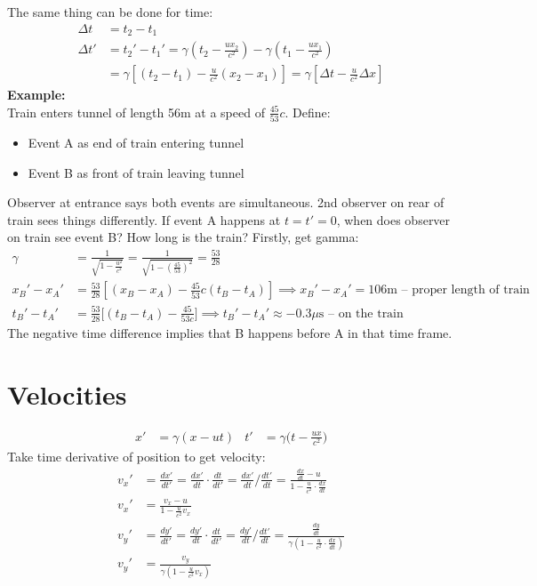 \documentclass[a4paper, 11pt, normalem]{report}
\begin{document}
The same thing can be done for time:
\begin{align}
    \Delta t &= t_{2} - t_{1} \\
    \Delta t' &= t_{2}' -t_{1}' = \gamma(t_{2} - \frac{ux_{2}}{c^{2}}) - \gamma(t_{1} - \frac{ux_{1}}{c^{2}}) \\
              &= \gamma[(t_{2} - t_{1}) - \frac{u}{c^{2}}(x_{2} - x_{1})] = \gamma[\Delta t - \frac{u}{c^{2}}\Delta x]
\end{align}
\textbf{Example:}\\
Train enters tunnel of length 56m at a speed of $\frac{45}{53}c$.
Define:
\begin{itemize}
    \item Event A as end of train entering tunnel
    \item Event B as front of train leaving tunnel
\end{itemize}
Observer at entrance says both events are simultaneous.
2nd observer on rear of train sees things differently.
If event A happens at $t = t' = 0$, when does observer on train see event B? 
How long is the train?
Firstly, get gamma:
\begin{align}
    \gamma &= \frac{1}{\sqrt{1 - \tfrac{u^{2}}{c^{2}}}} = \frac{1}{\sqrt{1 - (\tfrac{45}{53})^{2}}} = \frac{53}{28} \\
    x_{B}' - x_{A}' &= \frac{53}{28}[(x_{B} - x_{A}) - \frac{45}{53}c(t_{B} - t_{A})] \implies x_{B}' -x_{A}' = 106\text{m -- proper length of train} \\
    t_{B}' - t_{A}' &= \frac{53}{28}\Big[(t_{B} - t_{A}) - \frac{45}{53c}\Big] \implies t_{B}' - t_{A}' \approx -0.3\mu\text{s -- on the train}
\end{align}
The negative time difference implies that B happens before A in that time frame.

\section{Velocities}
\begin{align}
    x' &= \gamma(x - ut) & t' &= \gamma\Big(t - \frac{ux}{c^{2}}\Big)
\end{align}
Take time derivative of position to get velocity:
\begin{align}
    v_{x}' &= \frac{dx'}{dt'} = \frac{dx'}{dt}\cdot\frac{dt}{dt'} = \frac{dx'}{dt}\Big/\frac{dt'}{dt} = \frac{\tfrac{dx}{dt} - u}{1 - \tfrac{u}{c^{2}}\cdot\tfrac{dx}{dt}} \\
    v_{x}' &= \frac{v_{x} - u}{1 - \tfrac{u}{c^{2}}v_{x}} \\
    v_{y}' &= \frac{dy'}{dt'} = \frac{dy'}{dt}\cdot\frac{dt}{dt'} = \frac{dy'}{dt}\Big/\frac{dt'}{dt} = \frac{\tfrac{dy}{dt}}{\gamma(1 - \tfrac{u}{c^{2}}\cdot\tfrac{dx}{dt})} \\
    v_{y}' &= \frac{v_{y}}{\gamma(1 - \tfrac{u}{c^{2}}v_{x})}
\end{align}
\end{document}

